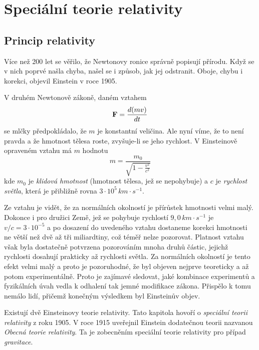 \chapter{Speciální teorie relativity}
\minitoc
\newpage
  \section{Princip relativity}
    Více než 200 let se věřilo, že Newtonovy ronice správně popisují přírodu. Když se v nich poprvé 
    našla chyba, našel se i způsob, jak jej odstranit. Oboje, chybu i korekci, objevil Einstein v 
    roce 1905.
    
    V druhém Newtonově zákoně, daném vztahem $$\mathbf{F} = \frac{d (mv)}{d t}$$ se mlčky předpokládalo, že 
    $m$ je konstantní veličina. Ale nyní víme, že to není pravda a že hmotnost tělesa roste, 
    zvyšuje-li se jeho rychlost. V Einsteinově opraveném vztahu má $m$ hodnotu 
    \begin{equation}\label{TEMP:eq_fey_rel_01}
      m = \frac{m_0}{\sqrt{1-\frac{v^2}{c^2}}}
    \end{equation}  
    kde $m_0$ je \emph{klidová hmotnost} (hmotnost tělesa, jež se nepohybuje) a $c$ je 
    \emph{rychlost světla}, která je přibližně rovna $3\cdot10^5\,
    km\cdot s^{-1}$.
    
    Ze vztahu je vidět, že za normálních okolností je přírůstek hmotnosti velmi malý. Dokonce i pro 
    družici Země, jež se pohybuje rychlostí $9,0\, km\cdot s^{-1}$ je $v/c = 3\cdot10^{-5}$ a po 
    dosazení do uvedeného vztahu dostaneme korekci hmotnosti ne větší než dvě až tři miliardtiny, 
    což téměř nelze pozorovat. Platnost vztahu však byla dostatečně potvrzena pozorováním mnoha 
    druhů částic, jejichž rychlosti dosahují prakticky až rychlosti světla. Za normálních okolností 
    je tento efekt velmi malý a proto je pozoruhodné, že byl objeven nejprve teoreticky a až potom 
    experimentálně. Proto je zajímavé sledovat, jaké kombinace experimentů a fyzikálních úvah vedla 
    k odhalení tak jemné modifikace zákona. Přispělo k tomu nemálo lidí, přičemž konečným výsledkem 
    byl Einsteinův objev.
    
    Existují dvě Einsteinovy teorie relativity. Tato kapitola hovoří o \emph{speciální teorii 
    relativity} z roku 1905. V roce 1915 uveřejnil Einstein dodatečnou teorii nazvanou \emph{Obecná 
    teorie relativity}. Ta je zobecněním speciální teorie relativity pro případ \emph{gravitace}.
         
